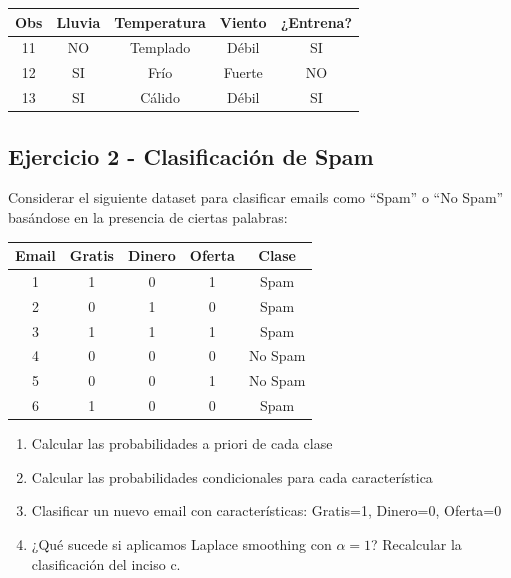 \documentclass[12pt]{article}
\begin{document}
\begin{table}[H]
    \centering
    \begin{tabular}{|c|c|c|c|c|}
        \hline
        \textbf{Obs} & \textbf{Lluvia} & \textbf{Temperatura} & \textbf{Viento} & \textbf{¿Entrena?} \\
        \hline
        11 & NO & Templado & Débil & SI \\
        \hline
        12 & SI & Frío & Fuerte & NO \\
        \hline
        13 & SI & Cálido & Débil & SI \\
        \hline
    \end{tabular}
\end{table}

\subsection{Ejercicio 2 - Clasificación de Spam}

Considerar el siguiente dataset para clasificar emails como ``Spam'' o ``No Spam'' basándose en la presencia de ciertas palabras:

\begin{table}[H]
    \centering
    \begin{tabular}{|c|c|c|c|c|}
        \hline
        \textbf{Email} & \textbf{Gratis} & \textbf{Dinero} & \textbf{Oferta} & \textbf{Clase} \\
        \hline
        1 & 1 & 0 & 1 & Spam \\
        \hline
        2 & 0 & 1 & 0 & Spam \\
        \hline
        3 & 1 & 1 & 1 & Spam \\
        \hline
        4 & 0 & 0 & 0 & No Spam \\
        \hline
        5 & 0 & 0 & 1 & No Spam \\
        \hline
        6 & 1 & 0 & 0 & Spam \\
        \hline
    \end{tabular}
\end{table}

\begin{enumerate}
    \item[a.] Calcular las probabilidades a priori de cada clase
    \item[b.] Calcular las probabilidades condicionales para cada característica
    \item[c.] Clasificar un nuevo email con características: Gratis=1, Dinero=0, Oferta=0
    \item[d.] ¿Qué sucede si aplicamos Laplace smoothing con $\alpha=1$? Recalcular la clasificación del inciso c.
\end{enumerate}
\end{document}
